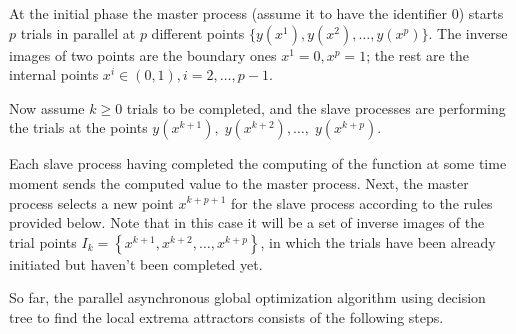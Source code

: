\documentclass{svproc}
\begin{document}
At the initial phase the master process (assume it to have the identifier $0$) starts $p$ trials in parallel at $p$ different points $\{y\left(x^1\right),y\left(x^2\right),\ldots,y\left(x^p\right)\}$.
The inverse images of two points are the boundary ones $x^1=0,x^p=1$; the rest are the internal points $x^i\in\left(0,1\right),i=2,\ldots,p-1$.

Now assume $k\geq0$ trials to be completed, and the slave processes are performing the trials at the points $y\left(x^{k+1}\right),\;y\left(x^{k+2}\right),\ldots,\;y\left(x^{k+p}\right)$.

Each slave process having completed the computing of the function at some time moment sends  the computed value to the master process. Next, the master process selects a new point  $x^{k+p+1}$ for the slave process according to the rules provided below. Note that in this case it will be a set of inverse images of the trial points  $I_k=\left\{x^{k+1},x^{k+2},\ldots,x^{k+p}\right\}$, in which the trials have been already initiated but haven't been completed yet.

So far, the parallel asynchronous global optimization algorithm using decision tree to find the local  extrema attractors consists of the following steps.
\end{document}
